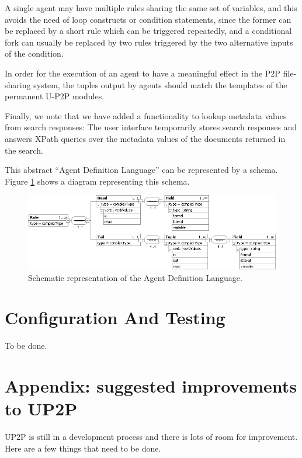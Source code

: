 \documentclass[titlepage]{article}%
\begin{document}
A single agent may have multiple rules sharing the same set of variables, and this avoids the need of loop constructs or condition statements, since the former can be replaced by a short rule which can be triggered repeatedly, and a conditional fork can usually be replaced by two rules triggered by the two alternative inputs of the condition.

In order for the execution of an agent to have a meaningful effect in the P2P file-sharing system, the tuples output by agents should match the templates of the permanent U-P2P modules.

Finally, we note that we have added a functionality to lookup metadata values from search responses: The user interface temporarily stores search responses and answers XPath queries over the metadata values of the documents returned in the search.

This abstract ``Agent Definition Language'' can be represented by a schema. Figure \ref{fig:AgentDefLanguage} shows a diagram representing this schema.

\begin{figure}[htb]
	\centering
		\includegraphics[width=1.00\textwidth]{diagrams/AgentDefXSDdiagram3.png}
	\caption{Schematic representation of the Agent Definition Language.}
	\label{fig:AgentDefLanguage}
\end{figure}


\section{Configuration And Testing}
\label{sec:ConfigTesting}
To be done.
\appendix
\newpage
\section{Appendix: suggested improvements to UP2P}

UP2P is still in a development process and there is lots of room for improvement. Here are a few things that need to be done.
\end{document}
